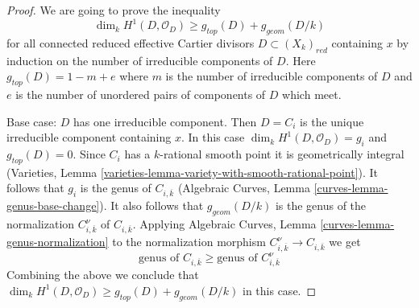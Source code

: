 \begin{proof}
We are going to prove the inequality
$$
\dim_k H^1(D, \mathcal{O}_D) \geq g_{top}(D) + g_{geom}(D/k)
$$
for all connected reduced effective Cartier divisors
$D \subset (X_k)_{red}$ containing $x$ by induction
on the number of irreducible components of $D$.
Here $g_{top}(D) = 1 - m + e$ where $m$ is the number of
irreducible components of $D$ and $e$ is the number of
unordered pairs of components of $D$ which meet.

\medskip\noindent
Base case: $D$ has one irreducible component. Then $D = C_i$
is the unique irreducible component containing $x$.
In this case $\dim_k H^1(D, \mathcal{O}_D) = g_i$
and $g_{top}(D) = 0$. Since $C_i$ has a $k$-rational smooth point
it is geometrically integral
(Varieties, Lemma \ref{varieties-lemma-variety-with-smooth-rational-point}).
It follows that $g_i$ is the genus of $C_{i, \overline{k}}$
(Algebraic Curves, Lemma \ref{curves-lemma-genus-base-change}).
It also follows that $g_{geom}(D/k)$ is the genus of the normalization
$C_{i, \overline{k}}^\nu$ of $C_{i, \overline{k}}$. Applying
Algebraic Curves, Lemma \ref{curves-lemma-genus-normalization}
to the normalization morphism $C_{i, \overline{k}}^\nu \to C_{i, \overline{k}}$
we get
\begin{equation}
\label{equation-genus-change-special-component}
\text{genus of }C_{i, \overline{k}} \geq
\text{genus of }C_{i, \overline{k}}^\nu
\end{equation}
Combining the above we conclude that
$\dim_k H^1(D, \mathcal{O}_D) \geq g_{top}(D) + g_{geom}(D/k)$
in this case.


\end{proof}

